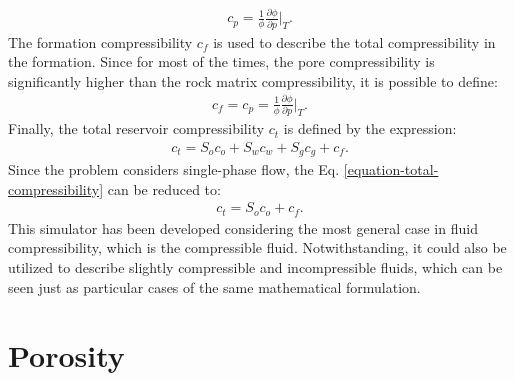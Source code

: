 %
\begin{align}
	\label{equation-pore-volume-compressibility-in-terms-of-porosity}
	c_p=\frac{1}{\phi} \frac{\partial \phi}{\partial p} \bigg|_T .
\end{align}
%
The formation compressibility $c_f$ is used to describe the total compressibility in the formation.
%
Since for most of the times, the pore compressibility is significantly higher than the rock matrix compressibility, it is possible to define:
%
\begin{align}
	\label{equation-formation-compressibility}
	c_f= c_p= \frac{1}{\phi} \frac{\partial \phi}{\partial p} \bigg|_T .
\end{align}
%
Finally, the total reservoir compressibility $c_t$ is defined by the expression:
%
%
\begin{align}
	 \label{equation-total-compressibility}
	 c_t= S_o c_o + S_w c_w + S_g c_g + c_f .
\end{align}
%
Since the problem considers single-phase flow, the Eq. \ref{equation-total-compressibility} can be reduced to:
%
%
\begin{align}
	\label{equation-total-compressibility-reduced}
	c_t= S_o c_o + c_f .
\end{align}
%
This simulator has been developed considering the most general case in fluid compressibility, which is the compressible fluid.
%
Notwithstanding, it could also be utilized to describe slightly compressible and incompressible fluids, which can be seen just as particular cases of the same mathematical formulation.

\section{Porosity}

